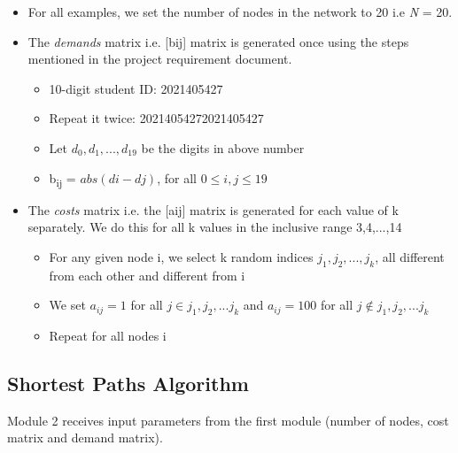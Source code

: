 \documentclass[12pt,letterpaper,titlepage,en-US]{article}
\begin{document}
\begin{itemize}
\item For all examples, we set the number of nodes in the network to 20 i.e \textit{N} = 20.

\item The \textit{demands} matrix i.e. [bij] matrix is generated once using the steps mentioned in the project requirement document.
\begin{itemize}
\item 10-digit student ID: 2021405427
\item Repeat it twice: 20214054272021405427 
\item Let $d_{0}, d_{1}, ... ,d_{19}$ be the digits in above number
\item b\textsubscript{ij} = $abs(di-dj)$, for all $0\leq i,j \leq 19$
\end{itemize}

\item The \textit{costs} matrix i.e. the [aij] matrix is generated for each value of k separately. We do this for all k values in the inclusive range 3,4,...,14
\begin{itemize}
\item For any given node i, we select k random indices $ j_{1}, j_{2}, . . . , j_{k}$, all different from each other and different from i
\item We set $a_{ij} = 1$ for all $j\in{j_{1},j_{2},... j_{k}} $ and $a_{ij} = 100$ for all $j \notin {j_{1},j_{2},... j_{k}}$
\item Repeat for all nodes i

\end{itemize}
\end{itemize}



\subsection{Shortest Paths Algorithm}
Module 2 receives input parameters from the first module (number of nodes, cost matrix and demand matrix).
\end{document}
